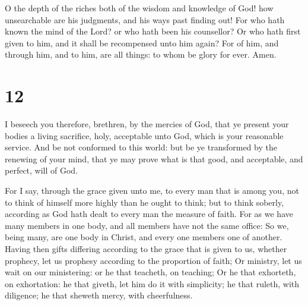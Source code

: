  O the depth of the riches both of the wisdom and
knowledge of God! how unsearchable are his judgments, and his ways past
finding out!  For who hath known the mind of the Lord? or
who hath been his counsellor?  Or who hath first given to
him, and it shall be recompensed unto him again?  For of
him, and through him, and to him, are all things: to whom be glory for
ever. Amen.

\hypertarget{section-11}{%
\section{12}\label{section-11}}

 I beseech you therefore, brethren, by the mercies of God,
that ye present your bodies a living sacrifice, holy, acceptable unto
God, which is your reasonable service.  And be not
conformed to this world: but be ye transformed by the renewing of your
mind, that ye may prove what is that good, and acceptable, and perfect,
will of God.

 For I say, through the grace given unto me, to every man
that is among you, not to think of himself more highly than he ought to
think; but to think soberly, according as God hath dealt to every man
the measure of faith.  For as we have many members in one
body, and all members have not the same office:  So we,
being many, are one body in Christ, and every one members one of
another.  Having then gifts differing according to the
grace that is given to us, whether prophecy, let us prophesy according
to the proportion of faith;  Or ministry, let us wait on
our ministering: or he that teacheth, on teaching;  Or he
that exhorteth, on exhortation: he that giveth, let him do it with
simplicity; he that ruleth, with diligence; he that sheweth mercy, with
cheerfulness.

